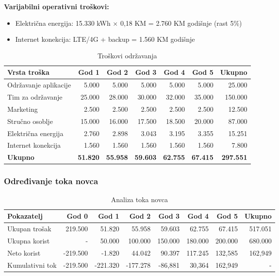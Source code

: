\documentclass{article}
\begin{document}
\textbf{Varijabilni operativni troškovi:}
\begin{itemize}
    \item Električna energija: 15.330 kWh × 0,18 KM = 2.760 KM godišnje (rast 5\%)
    \item Internet konekcija: LTE/4G + backup = 1.560 KM godišnje
\end{itemize}

\begin{table}[h]
\centering
\caption{Troškovi održavanja}
\begin{tabular}{|l|r|r|r|r|r|r|}
\hline
\textbf{Vrsta troška} & \textbf{God 1} & \textbf{God 2} & \textbf{God 3} & \textbf{God 4} & \textbf{God 5} & \textbf{Ukupno} \\ \hline
Održavanje aplikacije & 5.000 & 5.000 & 5.000 & 5.000 & 5.000 & 25.000 \\ \hline
Tim za održavanje & 25.000 & 28.000 & 30.000 & 32.000 & 35.000 & 150.000 \\ \hline
Marketing & 2.500 & 2.500 & 2.500 & 2.500 & 2.500 & 12.500 \\ \hline
Stručno osoblje & 15.000 & 16.000 & 17.500 & 18.500 & 20.000 & 87.000 \\ \hline
Električna energija & 2.760 & 2.898 & 3.043 & 3.195 & 3.355 & 15.251 \\ \hline
Internet konekcija & 1.560 & 1.560 & 1.560 & 1.560 & 1.560 & 7.800 \\ \hline
\textbf{Ukupno} & \textbf{51.820} & \textbf{55.958} & \textbf{59.603} & \textbf{62.755} & \textbf{67.415} & \textbf{297.551} \\ \hline
\end{tabular}
\end{table}

\subsubsection{Određivanje toka novca}
\begin{table}[h]
\centering
\caption{Analiza toka novca}
\begin{tabular}{|l|r|r|r|r|r|r|r|}
\hline
\textbf{Pokazatelj} & \textbf{God 0} & \textbf{God 1} & \textbf{God 2} & \textbf{God 3} & \textbf{God 4} & \textbf{God 5} & \textbf{Ukupno} \\ \hline
Ukupan trošak & 219.500 & 51.820 & 55.958 & 59.603 & 62.755 & 67.415 & 517.051 \\ \hline
Ukupna korist & - & 50.000 & 100.000 & 150.000 & 180.000 & 200.000 & 680.000 \\ \hline
Neto korist & -219.500 & -1.820 & 44.042 & 90.397 & 117.245 & 132,585 & 162,949 \\ \hline
Kumulativni tok & -219.500 & -221.320 & -177.278 & -86,881 & 30,364 & 162,949 & - \\ \hline
\end{tabular}
\end{table}
\end{document}
